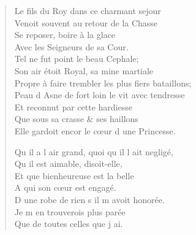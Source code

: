\begin{verse}
\vin Le fils du Roy dans ce charmant sejour \\
\vin Venoit souvent au retour de la Chasse \\
\vin Se reposer, boire à la glace \\
\vin Avec les Seigneurs de sa Cour. \\
\vin Tel ne fut point le beau Cephale; \\
Son air étoit Royal, sa mine martiale \\
Propre à faire trembler les plus fiers bataillons; \\
Peau d\textquotesingle{} Asne de fort loin le vit avec tendresse \\
\vin Et reconnut par cette hardiesse \\
\vin Que sous sa crasse \& ses haillons \\
Elle gardoit encor le cœur d\textquotesingle{} une Princesse.

\vin Qu\textquotesingle{} il a l\textquotesingle{} air grand, quoi qu\textquotesingle{} il l\textquotesingle{} ait negligé, \\
\vin Qu\textquotesingle{} il est aimable, disoit-elle, \\
\vin Et que bienheureuse est la belle \\
\vin A qui son cœur est engagé. \\
D\textquotesingle{} une robe de rien s\textquotesingle{} il m\textquotesingle{} avoit honorée. \\
\vin Je m\textquotesingle{} en trouverois plus parée \\
\vin Que de toutes celles que j\textquotesingle{} ai.


\end{verse}
